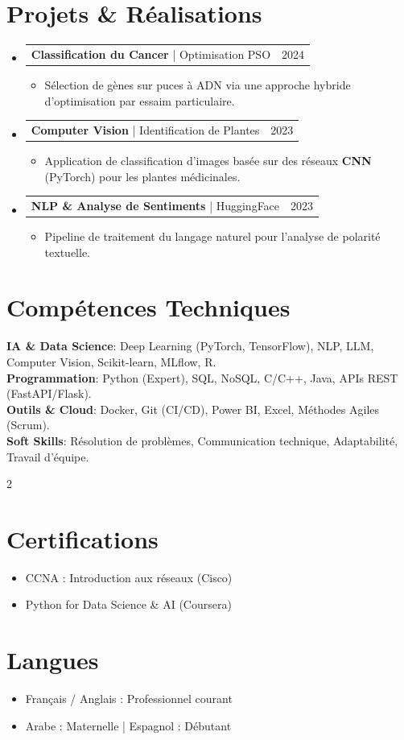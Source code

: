 \documentclass[a4paper,11pt]{article}
\makeatletter
\newcommand{\resumeItem}[1]{
  \item\small{
    {#1 \vspace{-2pt}}
  }
}
\newcommand{\resumeProjectHeading}[2]{
    \item
    \begin{tabular*}{0.97\textwidth}{l@{\extracolsep{\fill}}r}
      \small#1 & #2 \\
    \end{tabular*}\vspace{-7pt}
}
\newcommand{\resumeSubHeadingListStart}{\begin{itemize}[leftmargin=0.15in, label={}]}
\newcommand{\resumeSubHeadingListEnd}{\end{itemize}}
\newcommand{\resumeItemListStart}{\begin{itemize}[leftmargin=0.25in, labelsep=5pt, itemsep=1pt]}
\newcommand{\resumeItemListEnd}{\end{itemize}\vspace{-4pt}}
\makeatother
\begin{document}
\section{Projets & Réalisations}
\resumeSubHeadingListStart
    \resumeProjectHeading
      {\textbf{Classification du Cancer} | Optimisation PSO}{2024}
      \resumeItemListStart
        \resumeItem{Sélection de gènes sur puces à ADN via une approche hybride d'optimisation par essaim particulaire.}
      \resumeItemListEnd
    \resumeProjectHeading
      {\textbf{Computer Vision} | Identification de Plantes}{2023}
      \resumeItemListStart
        \resumeItem{Application de classification d'images basée sur des réseaux \textbf{CNN} (PyTorch) pour les plantes médicinales.}
      \resumeItemListEnd
    \resumeProjectHeading
      {\textbf{NLP \& Analyse de Sentiments} | HuggingFace}{2023}
      \resumeItemListStart
        \resumeItem{Pipeline de traitement du langage naturel pour l'analyse de polarité textuelle.}
      \resumeItemListEnd
\resumeSubHeadingListEnd

\section{Compétences Techniques}
\begin{itemize}[leftmargin=0.15in, label={}]
    \small{\item{
     \textbf{IA \& Data Science}{: Deep Learning (PyTorch, TensorFlow), NLP, LLM, Computer Vision, Scikit-learn, MLflow, R.} \\
     \textbf{Programmation}{: Python (Expert), SQL, NoSQL, C/C++, Java, APIs REST (FastAPI/Flask).} \\
     \textbf{Outils \& Cloud}{: Docker, Git (CI/CD), Power BI, Excel, Méthodes Agiles (Scrum).} \\
     \textbf{Soft Skills}{: Résolution de problèmes, Communication technique, Adaptabilité, Travail d'équipe.}
    }}
\end{itemize}

\vspace{-8pt}
\begin{multicols}{2}
    \section{Certifications}
    \resumeItemListStart
        \resumeItem{CCNA : Introduction aux réseaux (Cisco)}
        \resumeItem{Python for Data Science \& AI (Coursera)}
    \resumeItemListEnd
    
    \columnbreak
    
    \section{Langues}
    \resumeItemListStart
        \resumeItem{Français / Anglais : Professionnel courant}
        \resumeItem{Arabe : Maternelle | Espagnol : Débutant}
    \resumeItemListEnd
\end{multicols}
\end{document}

